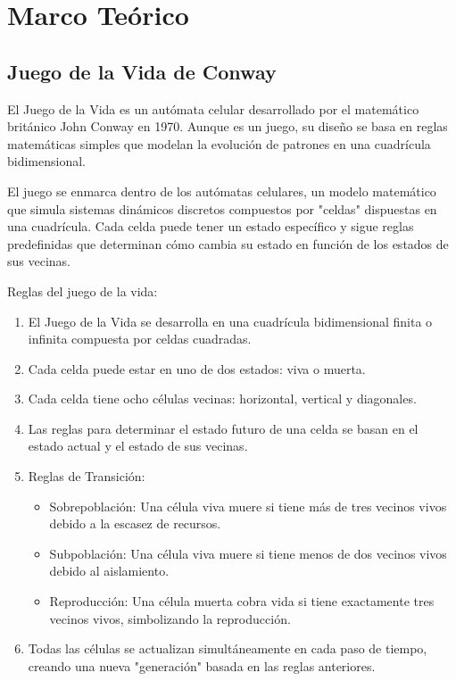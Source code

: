 \documentclass[conference]{IEEEtran}
\begin{document}
\section{Marco Teórico}
\subsection{Juego de la Vida de Conway}
El Juego de la Vida es un autómata celular desarrollado por el matemático británico John Conway en 1970. Aunque es un juego, su diseño se basa en reglas matemáticas simples que modelan la evolución de patrones en una cuadrícula bidimensional.

El juego se enmarca dentro de los autómatas celulares, un modelo matemático que simula sistemas dinámicos discretos compuestos por "celdas" dispuestas en una cuadrícula. Cada celda puede tener un estado específico y sigue reglas predefinidas que determinan cómo cambia su estado en función de los estados de sus vecinas.

Reglas del juego de la vida:

\begin{enumerate}
	\item El Juego de la Vida se desarrolla en una cuadrícula bidimensional finita o infinita compuesta por celdas cuadradas.
	\item Cada celda puede estar en uno de dos estados: viva o muerta.
	\item Cada celda tiene ocho células vecinas: horizontal, vertical y diagonales.
	\item Las reglas para determinar el estado futuro de una celda se basan en el estado actual y el estado de sus vecinas.
	\item Reglas de Transición:
	\begin{itemize}
		\item Sobrepoblación: Una célula viva muere si tiene más de tres vecinos vivos debido a la escasez de recursos.
		\item Subpoblación: Una célula viva muere si tiene menos de dos vecinos vivos debido al aislamiento.
		\item Reproducción: Una célula muerta cobra vida si tiene exactamente tres vecinos vivos, simbolizando la reproducción.
	\end{itemize}
	\item Todas las células se actualizan simultáneamente en cada paso de tiempo, creando una nueva "generación" basada en las reglas anteriores.
\end{enumerate}
\end{document}

